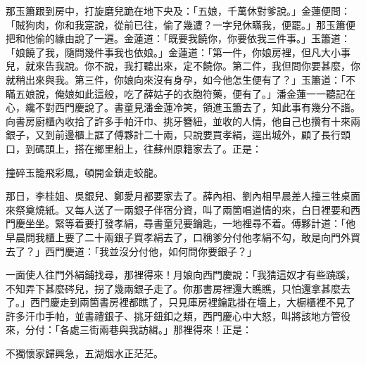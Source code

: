 那玉簫跟到房中，打旋磨兒跪在地下央及：「五娘，千萬休對爹說。」金蓮便問：「賊狗肉，你和我寔說，從前已往，偷了幾遭？一字兒休瞞我，便罷。」那玉簫便把和他偷的緣由說了一遍。金蓮道：「既要我饒你，你要依我三件事。」玉簫道：「娘饒了我，隨問幾件事我也依娘。」金蓮道：「第一件，你娘房裡，但凡大小事兒，就來告我說。你不說，我打聽出來，定不饒你。第二件，我但問你要甚麼，你就稍出來與我。第三件，你娘向來沒有身孕，如今他怎生便有了？」{}玉簫道：「不瞞五娘說，俺娘如此這般，吃了薛姑子的衣胞符藥，便有了。」潘金蓮一一聽記在心，纔不對西門慶說了。書童見潘金蓮冷笑，領進玉簫去了，知此事有幾分不諧。向書房廚櫃內收拾了許多手帕汗巾、挑牙簪紐，並收的人情，他自己也攢有十來兩銀子，又到前邊櫃上誆了傅夥計二十兩，只說要買孝絹，逕出城外，顧了長行頭口，到碼頭上，搭在鄉里船上，往蘇州原籍家去了。{}正是：

\begin{myquote} 
撞碎玉籠飛彩鳳，頓開金鎖走蛟龍。
\end{myquote} 

那日，李桂姐、吳銀兒、鄭愛月都要家去了。薛內相、劉內相早晨差人擡三牲桌面來祭奠燒紙。又每人送了一兩銀子伴宿分資，叫了兩箇唱道情的來，白日裡要和西門慶坐坐。緊等着要打發孝絹，尋書童兒要鑰匙，一地裡尋不着。傅夥計道：「他早晨問我櫃上要了二十兩銀子買孝絹去了，口稱爹分付他孝絹不勾，敢是向門外買去了？」西門慶道：「我並沒分付他，如何問你要銀子？」

一面使人往門外絹鋪找尋，那裡得來！月娘向西門慶說：「我猜這奴才有些蹺蹊，不知弄下甚麼硶兒，{}拐了幾兩銀子走了。你那書房裡還大瞧瞧，只怕還拿甚麼去了。」西門慶走到兩箇書房裡都瞧了，只見庫房裡鑰匙掛在墻上，大橱櫃裡不見了許多汗巾手帕，並書禮銀子、挑牙鈕釦之類，西門慶心中大怒，叫將該地方管役來，分付：「各處三街兩巷與我訪緝。」那裡得來！正是：

\begin{myquote} 
不獨懷家歸興急，五湖烟水正茫茫。
\end{myquote} 

